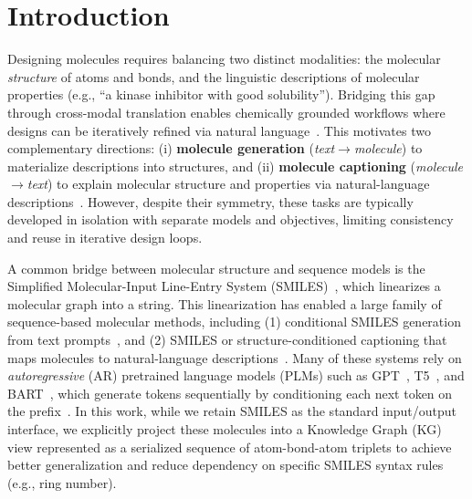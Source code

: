\section{Introduction}\label{Introduction}
Designing molecules requires balancing two distinct modalities: the molecular \emph{structure} of atoms and bonds, and the linguistic descriptions of molecular properties (e.g., ``a kinase inhibitor with good solubility''). Bridging this gap through cross-modal translation enables chemically grounded workflows where designs can be iteratively refined via natural language~\cite{zheng2023structureinformedlanguagemodelsprotein,fatemi2024talk}. This motivates two complementary directions: (i) \textbf{molecule generation} (\emph{text}$\rightarrow$\emph{molecule}) to materialize descriptions into structures, and (ii) \textbf{molecule captioning} (\emph{molecule}$\rightarrow$\emph{text}) to explain molecular structure and properties via natural-language descriptions~\cite{edwards-etal-2022-translation,zeng2023interactivemoleculardiscoverynatural}. However, despite their symmetry, these tasks are typically developed in isolation with separate models and objectives, limiting consistency and reuse in iterative design loops.

\noindent A common bridge between molecular structure and sequence models is the Simplified Molecular-Input Line-Entry System (SMILES)~\cite{doi:10.1021/ci00057a005,doi:10.1021/ci00062a008}, which linearizes a molecular graph into a string. This linearization has enabled a large family of sequence-based molecular methods, including (1) conditional SMILES generation from text prompts~\cite{doi:10.1021/acs.jcim.1c00600,D1RA03086H,irwin2022chemformer}, and (2) SMILES or structure-conditioned captioning that maps molecules to natural-language descriptions~\cite{edwards-etal-2022-translation,zeng2023interactivemoleculardiscoverynatural}. Many of these systems rely on \emph{autoregressive} (AR) pretrained language models (PLMs) such as GPT~\cite{10.1007/s11023-020-09548-1}, T5~\cite{JMLR:v21:20-074}, and BART~\cite{lewis-etal-2020-bart}, which generate tokens sequentially by conditioning each next token on the prefix~\cite{doi:10.1021/acs.jcim.1c00600,D1RA03086H,irwin2022chemformer}. In this work, while we retain SMILES as the standard input/output interface, we explicitly project these molecules into a Knowledge Graph (KG) view represented as a serialized sequence of atom-bond-atom triplets to achieve better generalization and reduce dependency on specific SMILES syntax rules (e.g., ring number). 

